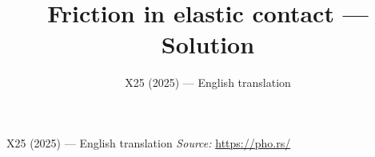 \documentclass[11pt,a4paper]{article}
\title{\textbf{Friction in elastic contact --- Solution}}
\author{\normalsize X25 (2025) — English translation}
\date{}
\begin{document}
\maketitle
X25 (2025) — English translation
\vspace{1em}
\noindent\textit{Source:} \url{https://pho.rs/}
\end{document}

